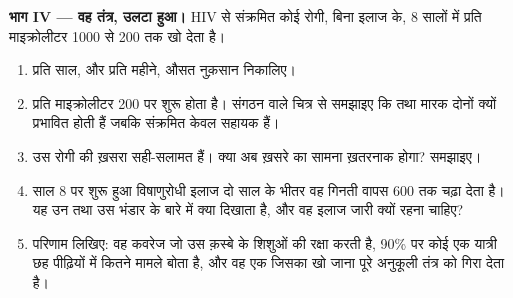 \begin{problem}
\medskip
\noindent\textbf{भाग IV --- वह तंत्र, उलटा हुआ।}
HIV से संक्रमित कोई रोगी, बिना इलाज के, 8 सालों में प्रति माइक्रोलीटर 1000
से 200 तक  खो देता है।
\begin{enumerate}[resume]
  \item प्रति साल, और प्रति महीने, औसत नुक़सान निकालिए।
  \item प्रति माइक्रोलीटर 200 पर  शुरू होता है। संगठन वाले चित्र से
        समझाइए कि  तथा मारक  दोनों क्यों प्रभावित होती
        हैं जबकि संक्रमित केवल सहायक  हैं।
  \item उस रोगी की ख़सरा  सही-सलामत हैं। क्या अब ख़सरे का
        सामना ख़तरनाक होगा? समझाइए।
  \item साल 8 पर शुरू हुआ विषाणुरोधी इलाज दो साल के भीतर वह गिनती वापस 600
        तक चढ़ा देता है। यह उन  तथा उस भंडार के बारे में
        क्या दिखाता है, और वह इलाज जारी क्यों रहना चाहिए?
  \item परिणाम लिखिए: वह कवरेज जो उस क़स्बे के शिशुओं की रक्षा करती है, 90\%
        पर कोई एक यात्री छह पीढ़ियों में कितने मामले बोता है, और वह एक
         जिसका खो जाना पूरे अनुकूली तंत्र को गिरा देता है।
\end{enumerate}
\end{problem}

